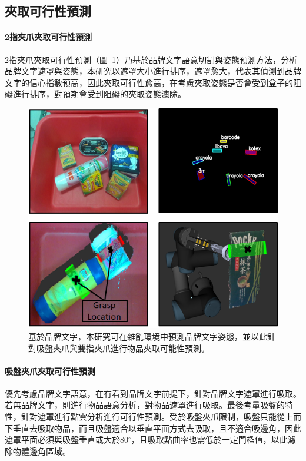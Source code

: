 \subsection{夾取可行性預測}
\paragraph{2指夾爪夾取可行性預測}
2指夾爪夾取可行性預測（圖~\ref{figure:affordance}）乃基於品牌文字語意切割與姿態預測方法，分析品牌文字遮罩與姿態，本研究以遮罩大小進行排序，遮罩愈大，代表其偵測到品牌文字的信心指數預高，因此夾取可行性愈高，在考慮夾取姿態是否會受到盒子的阻礙進行排序，對預期會受到阻礙的夾取姿態濾除。

\begin{figure}[H]
	\centering
	\includegraphics[height=!, width=0.8\linewidth, keepaspectratio=true]
	{./figures/affordance_v4.png}
  \caption{基於品牌文字，本研究可在雜亂環境中預測品牌文字姿態，並以此針對吸盤夾爪與雙指夾爪進行物品夾取可能性預測。}
  \label{figure:affordance}
\end{figure}


\paragraph{吸盤夾爪夾取可行性預測}
優先考慮品牌文字語意，在有看到品牌文字前提下，針對品牌文字遮罩進行吸取。若無品牌文字，則進行物品語意分析，對物品遮罩進行吸取。最後考量吸盤的特性，針對遮罩進行點雲分析進行可行性預測。受於吸盤夾爪限制，吸盤只能從上而下垂直去吸取物品，而且吸盤適合以垂直平面方式去吸取，且不適合吸邊角，因此遮罩平面必須與吸盤垂直或大於80$^{\circ}$，且吸取點曲率也需低於一定門檻值，以此濾除物體邊角區域。



